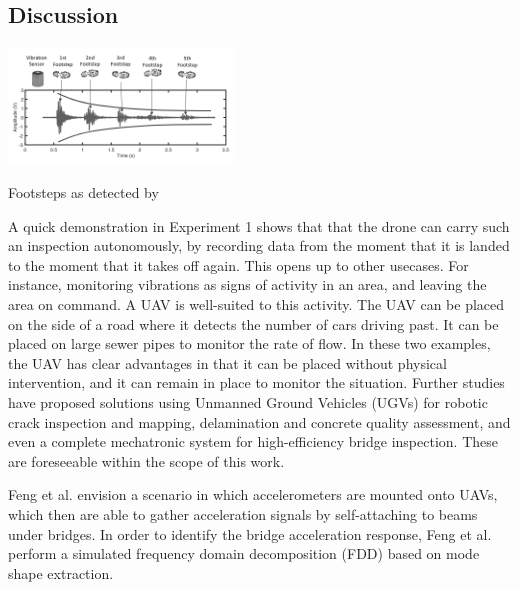 \pagebreak
\subsection{Discussion}\label{section:discuss_vibrations}

\begin{marginfigure}%
    \raggedright \vspace{1cm}
    \includegraphics[width=6cm]{images/stage_graphs/vibration_results/reference_footsteps_bw.png}
    \caption{Footsteps as detected by \cite{gait_analysis}}
    \label{fig:footstep_reference}
\end{marginfigure}  

A quick demonstration in Experiment 1 shows that that the drone can carry such an inspection autonomously, by recording data from the moment that it is landed to the moment that it takes off again. This opens up to other usecases. For instance,  monitoring vibrations as signs of activity in an area, and leaving the area on command. A UAV is well-suited to this activity. The UAV can be placed on the side of a road where it detects the number of cars driving past. It can be placed on large sewer pipes to monitor the rate of flow. In these two examples, the UAV has clear advantages in that it can be placed without physical intervention, and it can remain in place to monitor the situation. Further studies have proposed solutions \cite{sanchez-cuevas_ramon-soria_arrue_ollero_heredia_2019} using Unmanned Ground Vehicles (UGVs) for robotic crack inspection and mapping, delamination and concrete quality assessment, and even a complete mechatronic system for high-efficiency bridge inspection. These are foreseeable within the scope of this work.

Feng et al. \cite{feng_casero_gonzález_2019}  envision a scenario in which accelerometers are mounted onto UAVs, which then are able to
gather acceleration signals by self-attaching to beams under bridges. In order to identify the bridge acceleration response, Feng et al. perform a simulated frequency domain decomposition (FDD) based on mode shape extraction. 

